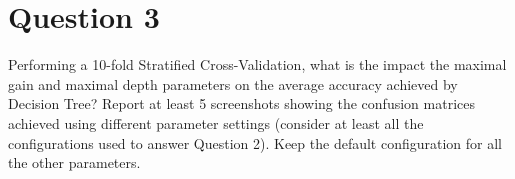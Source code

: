 \section{Question 3}

\begin{question}
    Performing a 10-fold Stratified Cross-Validation, what is the impact the maximal gain and maximal
    depth parameters on the average accuracy achieved by Decision Tree? Report at least 5 screenshots
    showing the confusion matrices achieved using different parameter settings (consider at least all
    the configurations used to answer Question 2). Keep the default configuration for all the other
    parameters.
\end{question}

\begin{answer}
\end{answer}
